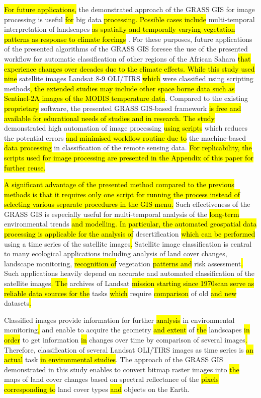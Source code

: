 \documentclass[asi,article,submit,pdftex,moreauthors]{Definitions/mdpi}
\begin{document}
\hl{For future applications, }the demonstrated approach of the GRASS GIS for image processing is useful \hl{for} big data \hl{processing. Possible cases include }multi-temporal interpretation of landscapes \hl{as spatially and temporally varying vegetation patterns as response to climate forcings} \cite{McDermid,Peteretal2020,Pengetal2020}. For these purposes, future applications of the presented algorithms of the GRASS GIS foresee\hl{ }the use of the presented workflow for automatic classification of other regions of the African Sahara \hl{ that experience changes over decades due to the climate effects. While this study used nine} satellite images Landsat 8-9 OLI/TIRS \hl{which }were classified using scripting methods\hl{, the extended studies may include other space borne data such as Sentinel-2A images of the MODIS temperature data}. Compared to the existing \hl{proprietary} software, the presented\hl{ }GRASS GIS-based framework \hl{is free and available for educational needs of studies and in research. The study }demonstrated high automation of image processing \hl{using scripts }which reduces the potential errors \hl{and minimised workflow routine due to} the machine-based \hl{data processing} in classification of the remote sensing data.\hl{ For replicability, the scripts used for image processing are presented in the Appendix of this paper for further reuse.}

\hl{A significant advantage of the presented method compared to the previous methods is that it requires only one script for running the process instead of selecting various separate procedures in the GIS menu. }Such effectiveness of the GRASS GIS is especially useful for multi-temporal analysis of the \hl{long-term} environmental trends\hl{ and modelling. In particular, the automated geospatial data processing is applicable for the analysis of} desertification \hl{which can be performed }using a time series of the satellite images\hl{. }Satellite image classification is central to many\hl{ }ecological applications including analysis of land cover changes, landscape monitoring, \hl{recognition of }vegetation \hl{patterns and} risk assessment\hl{. }Such applications heavily depend on accurate and automated classification of the satellite images\hl{. The} archives of Landsat\hl{ mission starting since 1970scan serve as reliable data sources for the }tasks \hl{which }require \hl{comparison} of old \hl{and new }datasets\hl{.} 

Classified images provide information for further \hl{analysis} in environmental monitoring\hl{, }and enable to acquire the geometry \hl{and extent }of \hl{the }landscapes \hl{in order }to get information \hl{in} changes over time by comparison of several images\hl{. }Therefore, classification of several Landsat OLI/TIRS images as time series is \hl{an actual} task \hl{in environmental studies}. The approach of the GRASS GIS\hl{ }demonstrated in this study\hl{ }enables to convert bitmap raster images into \hl{the }maps of land cover changes based on\hl{ }spectral reflectance of the \hl{pixels corresponding to }land cover types \hl{and} objects on the\hl{ }Earth.
\end{document}
